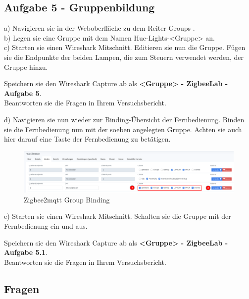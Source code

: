\subsection{Aufgabe 5 - Gruppenbildung}

a) Navigieren sie in der Weboberfläche zu dem Reiter \grqq Groups \grqq{}. \\
b) Legen sie eine Gruppe mit dem Namen \grqq Hue-Lights-<Gruppe> \grqq{} an.\\
c) Starten sie einen Wireshark Mitschnitt. Editieren sie nun die Gruppe. Fügen sie die Endpunkte der beiden Lampen, die zum Steuern verwendet werden, der Gruppe hinzu. \\


\begin{Aufgabe}
    Speichern sie den Wireshark Capture ab als \textbf{\grqq <Gruppe> - ZigbeeLab - Aufgabe 5\grqq{}}. \\
    Beantworten sie die Fragen in Ihrem Versuchsbericht.
\end{Aufgabe}

d) Navigieren sie nun wieder zur Binding-Übersicht der Fernbedienung. Binden sie die Fernbedienung nun mit der soeben
angelegten Gruppe. Achten sie auch hier darauf eine Taste der Fernbedienung zu betätigen.\\

\begin{figure}[H]
    \centering
    \includegraphics[width=1\textwidth]{media/Z2M-Group-Binding.png}
    \caption{Zigbee2mqtt Group Binding}
\end{figure}

e) Starten sie einen Wireshark Mitschnitt. Schalten sie die Gruppe mit der Fernbedienung ein und aus.

\begin{Aufgabe}
    Speichern sie den Wireshark Capture ab als \textbf{\grqq <Gruppe> - ZigbeeLab - Aufgabe 5.1\grqq{}}. \\
    Beantworten sie die Fragen in Ihrem Versuchsbericht.
\end{Aufgabe}

\subsection{Fragen}

